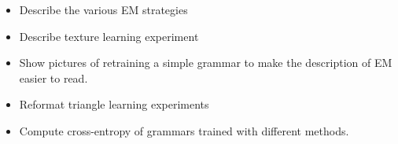 
\begin{itemize}

\item Describe the various EM strategies

\item Describe texture learning experiment

\item Show pictures of retraining a simple grammar to make the description of EM easier to read.

\item Reformat triangle learning experiments

\item Compute cross-entropy of grammars trained with different methods.

\end{itemize}

